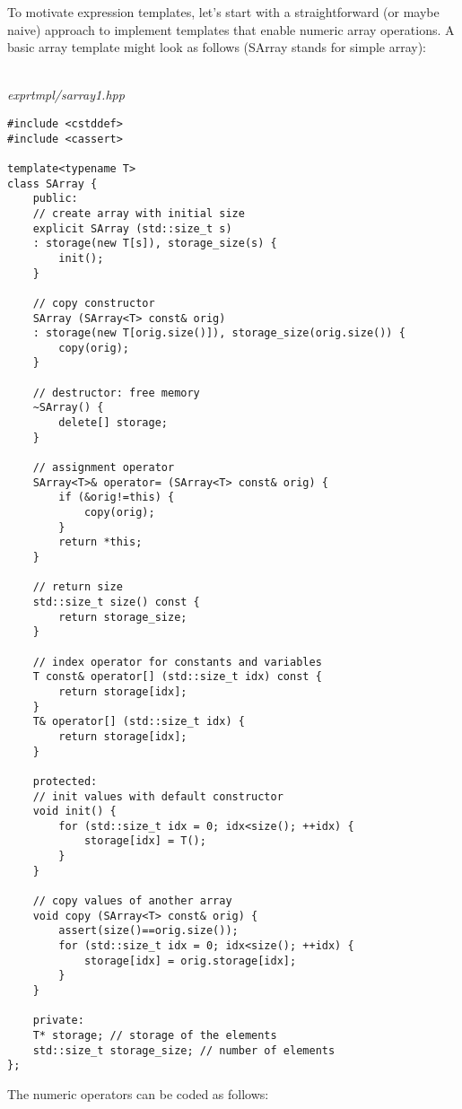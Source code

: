 To motivate expression templates, let’s start with a straightforward (or maybe naive) approach to implement templates that enable numeric array operations. A basic array template might look as follows (SArray stands for simple array):

\hspace*{\fill} \\ %
\noindent
\textit{exprtmpl/sarray1.hpp}
\begin{lstlisting}[style=styleCXX]
#include <cstddef>
#include <cassert>

template<typename T>
class SArray {
	public:
	// create array with initial size
	explicit SArray (std::size_t s)
	: storage(new T[s]), storage_size(s) {
		init();
	}

	// copy constructor
	SArray (SArray<T> const& orig)
	: storage(new T[orig.size()]), storage_size(orig.size()) {
		copy(orig);
	}

	// destructor: free memory
	~SArray() {
		delete[] storage;
	}

	// assignment operator
	SArray<T>& operator= (SArray<T> const& orig) {
		if (&orig!=this) {
			copy(orig);
		}
		return *this;
	}

	// return size
	std::size_t size() const {
		return storage_size;
	}

	// index operator for constants and variables
	T const& operator[] (std::size_t idx) const {
		return storage[idx];
	}
	T& operator[] (std::size_t idx) {
		return storage[idx];
	}

	protected:
	// init values with default constructor
	void init() {
		for (std::size_t idx = 0; idx<size(); ++idx) {
			storage[idx] = T();
		}
	}

	// copy values of another array
	void copy (SArray<T> const& orig) {
		assert(size()==orig.size());
		for (std::size_t idx = 0; idx<size(); ++idx) {
			storage[idx] = orig.storage[idx];
		}
	}

	private:
	T* storage; // storage of the elements
	std::size_t storage_size; // number of elements
};
\end{lstlisting}

The numeric operators can be coded as follows:

